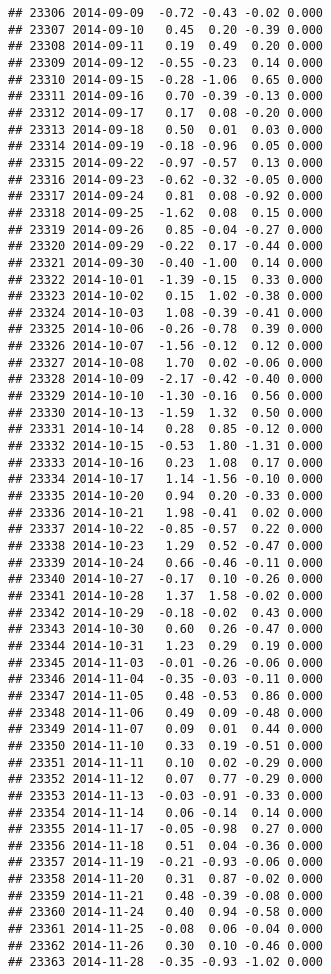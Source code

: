 \documentclass[
]{article}
\begin{document}
\begin{verbatim}
## 23306 2014-09-09  -0.72 -0.43 -0.02 0.000
## 23307 2014-09-10   0.45  0.20 -0.39 0.000
## 23308 2014-09-11   0.19  0.49  0.20 0.000
## 23309 2014-09-12  -0.55 -0.23  0.14 0.000
## 23310 2014-09-15  -0.28 -1.06  0.65 0.000
## 23311 2014-09-16   0.70 -0.39 -0.13 0.000
## 23312 2014-09-17   0.17  0.08 -0.20 0.000
## 23313 2014-09-18   0.50  0.01  0.03 0.000
## 23314 2014-09-19  -0.18 -0.96  0.05 0.000
## 23315 2014-09-22  -0.97 -0.57  0.13 0.000
## 23316 2014-09-23  -0.62 -0.32 -0.05 0.000
## 23317 2014-09-24   0.81  0.08 -0.92 0.000
## 23318 2014-09-25  -1.62  0.08  0.15 0.000
## 23319 2014-09-26   0.85 -0.04 -0.27 0.000
## 23320 2014-09-29  -0.22  0.17 -0.44 0.000
## 23321 2014-09-30  -0.40 -1.00  0.14 0.000
## 23322 2014-10-01  -1.39 -0.15  0.33 0.000
## 23323 2014-10-02   0.15  1.02 -0.38 0.000
## 23324 2014-10-03   1.08 -0.39 -0.41 0.000
## 23325 2014-10-06  -0.26 -0.78  0.39 0.000
## 23326 2014-10-07  -1.56 -0.12  0.12 0.000
## 23327 2014-10-08   1.70  0.02 -0.06 0.000
## 23328 2014-10-09  -2.17 -0.42 -0.40 0.000
## 23329 2014-10-10  -1.30 -0.16  0.56 0.000
## 23330 2014-10-13  -1.59  1.32  0.50 0.000
## 23331 2014-10-14   0.28  0.85 -0.12 0.000
## 23332 2014-10-15  -0.53  1.80 -1.31 0.000
## 23333 2014-10-16   0.23  1.08  0.17 0.000
## 23334 2014-10-17   1.14 -1.56 -0.10 0.000
## 23335 2014-10-20   0.94  0.20 -0.33 0.000
## 23336 2014-10-21   1.98 -0.41  0.02 0.000
## 23337 2014-10-22  -0.85 -0.57  0.22 0.000
## 23338 2014-10-23   1.29  0.52 -0.47 0.000
## 23339 2014-10-24   0.66 -0.46 -0.11 0.000
## 23340 2014-10-27  -0.17  0.10 -0.26 0.000
## 23341 2014-10-28   1.37  1.58 -0.02 0.000
## 23342 2014-10-29  -0.18 -0.02  0.43 0.000
## 23343 2014-10-30   0.60  0.26 -0.47 0.000
## 23344 2014-10-31   1.23  0.29  0.19 0.000
## 23345 2014-11-03  -0.01 -0.26 -0.06 0.000
## 23346 2014-11-04  -0.35 -0.03 -0.11 0.000
## 23347 2014-11-05   0.48 -0.53  0.86 0.000
## 23348 2014-11-06   0.49  0.09 -0.48 0.000
## 23349 2014-11-07   0.09  0.01  0.44 0.000
## 23350 2014-11-10   0.33  0.19 -0.51 0.000
## 23351 2014-11-11   0.10  0.02 -0.29 0.000
## 23352 2014-11-12   0.07  0.77 -0.29 0.000
## 23353 2014-11-13  -0.03 -0.91 -0.33 0.000
## 23354 2014-11-14   0.06 -0.14  0.14 0.000
## 23355 2014-11-17  -0.05 -0.98  0.27 0.000
## 23356 2014-11-18   0.51  0.04 -0.36 0.000
## 23357 2014-11-19  -0.21 -0.93 -0.06 0.000
## 23358 2014-11-20   0.31  0.87 -0.02 0.000
## 23359 2014-11-21   0.48 -0.39 -0.08 0.000
## 23360 2014-11-24   0.40  0.94 -0.58 0.000
## 23361 2014-11-25  -0.08  0.06 -0.04 0.000
## 23362 2014-11-26   0.30  0.10 -0.46 0.000
## 23363 2014-11-28  -0.35 -0.93 -1.02 0.000

\end{verbatim}
\end{document}
